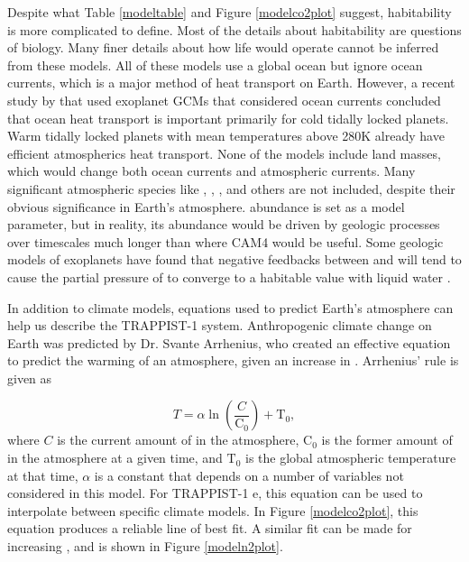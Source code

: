 Despite what Table \ref{modeltable} and Figure \ref{modelco2plot} suggest,
 habitability is more complicated to define. Most of the details about
 habitability are questions of biology. Many finer details about how life would
 operate cannot be inferred from these models. All of these models use a global
 ocean but ignore ocean currents, which is a major method of heat transport on
 Earth. However, a recent study by \citet{yang19} that used exoplanet GCMs that
 considered ocean currents
 concluded that ocean heat transport is important primarily for cold tidally
 locked planets. Warm tidally locked planets with mean temperatures above 280K
 already have efficient atmospherics heat transport.
 None of the models include land masses, which would change both ocean currents
 and atmospheric currents. Many significant atmospheric species like ,
 , , and others are not included, despite their obvious
 significance in Earth's atmosphere.  abundance is set as a model
 parameter, but in reality, its abundance would be driven by geologic processes
 over timescales much longer than where CAM4 would be useful. Some geologic
 models of exoplanets have found that negative feedbacks between  and
  will tend to cause the partial pressure of  to converge
 to a habitable value with liquid water \citep{co2geology}.

In addition to climate models, equations used to predict Earth's atmosphere can
 help us describe the TRAPPIST-1 system. Anthropogenic climate change on Earth
 was predicted by Dr. Svante Arrhenius, who created an effective equation to
 predict the warming of an atmosphere, given an increase in .
 Arrhenius' rule is given as

\begin{equation}
    T=\alpha\ln{\left(\frac{C}{\mathrm{C_0}}\right)}+\mathrm{T_0},
\end{equation}
where $C$ is the current amount of  in the atmosphere, $\mathrm{C_0}$
 is the former amount of  in the atmosphere at a given time, and
 $\mathrm{T_0}$ is the global atmospheric temperature at that time, $\alpha$ is
 a constant that depends on a number of variables not considered in this model. For
 TRAPPIST-1 e, this equation can be used to interpolate between specific climate
 models. In Figure \ref{modelco2plot},
 this equation produces a reliable line of best fit. A similar fit can be made for
 increasing , and is shown in Figure \ref{modeln2plot}.

